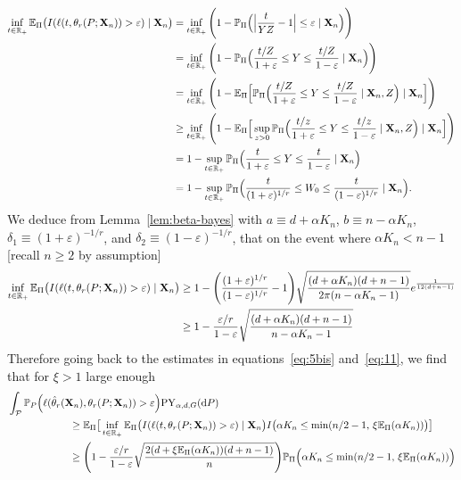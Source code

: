 \documentclass{article}
\newcommand{\1}{\boldsymbol{1}}
\newcommand{\EE}{\mathbb{E}}
\newcommand{\PP}{\mathbb{P}}
\theoremstyle{plain}
\begin{document}
\begin{align*}
  \inf_{t\in \NNReals}\EE_{\Pi}\big(I( \ell(t,\theta_r(P;\mathbf{X}_n)) > \varepsilon ) \mid \mathbf{X}_n\big)%
  \notag
  &= \inf_{t\in \NNReals}\Bigg(1 - \PP_{\Pi}\Big(\Big|\frac{t}{YZ} - 1 \Big| \leq \varepsilon  \mid \mathbf{X}_n\Big) \Bigg)\\
  \notag
  &= \inf_{t\in \NNReals}\Bigg(1 - \PP_{\Pi}\Big( \frac{t/Z}{1+\varepsilon} \leq Y \leq \frac{t/Z}{1-\varepsilon}  \mid \mathbf{X}_n\Big) \Bigg)\\
  \notag
  &=\inf_{t\in \NNReals}\Bigg(1 - \EE_{\Pi}\Big[\PP_{\Pi}\Big( \frac{t/Z}{1+\varepsilon} \leq Y \leq \frac{t/Z}{1-\varepsilon}  \mid \mathbf{X}_n,Z\Big) \mid \mathbf{X}_n\Big] \Bigg)\\
  \notag
  &\geq \inf_{t\in \NNReals}\Bigg(1 - \EE_{\Pi}\Big[\sup_{z > 0}\PP_{\Pi}\Big( \frac{t/z}{1+\varepsilon} \leq Y \leq \frac{t/z}{1-\varepsilon}  \mid \mathbf{X}_n,Z\Big) \mid \mathbf{X}_n\Big] \Bigg)\\
  \notag
  &= 1 - \sup_{t\in \NNReals}\PP_{\Pi}\Big(\frac{t}{1+\varepsilon} \leq Y \leq \frac{t}{1-\varepsilon} \mid \mathbf{X}_n \Big)\\
  &= 1 - \sup_{t\in \NNReals}\PP_{\Pi}\Big(\frac{t}{(1+\varepsilon)^{1/r}} \leq W_0 \leq \frac{t}{(1-\varepsilon)^{1/r}} \mid \mathbf{X}_n \Big).
\end{align*}%
We deduce from Lemma~\ref{lem:beta-bayes} with $a \equiv d + \alpha K_n$, $b \equiv n - \alpha K_n$, $\delta_1 \equiv (1+\varepsilon)^{-1/r}$, and $\delta_2 \equiv (1-\varepsilon)^{-1/r}$, that on the event where $\alpha K_n < n-1$ [recall $n\geq 2$ by assumption]
\begin{align*}
  \notag
  \inf_{t\in \NNReals}\EE_{\Pi}\big(I( \ell(t,\theta_r(P;\mathbf{X}_n)) > \varepsilon ) \mid \mathbf{X}_n\big)%
  &\geq 1 - \Bigg(\frac{(1+\varepsilon)^{1/r}}{(1-\varepsilon)^{1/r}} - 1 \Bigg)\sqrt{\frac{(d + \alpha K_n)(d + n-1)}{2\pi(n - \alpha K_n - 1)}}e^{\frac{1}{12(d+n-1)}}\\
  &\geq 1 - \frac{\varepsilon/r}{1-\varepsilon} \sqrt{\frac{(d + \alpha K_n)(d + n-1)}{n - \alpha K_n - 1}}
\end{align*}
Therefore going back to the estimates in equations~\eqref{eq:5bis} and~\eqref{eq:11}, we find that for $\xi > 1$ large enough
\begin{align}
  \notag
  &\int_{\mathcal{P}}\PP_P\Big(\ell(\hat{\theta}_r(\mathbf{X}_n),\theta_r(P;\mathbf{X}_n)) > \varepsilon \Big) \mathrm{PY}_{\alpha,d,G}(\intd P)\\
  \notag
  &\qquad\qquad\qquad\geq \EE_{\Pi}\big[ \inf_{t \in \NNReals} \EE_{\Pi}\big(I(  \ell(t,\theta_r(P;\mathbf{X}_n)) > \varepsilon ) \mid \mathbf{X}_n\big)I\big(\alpha K_n \leq \min(n/2-1,\, \xi \EE_{\Pi}(\alpha K_n)) \big) \big]\\
  \label{eq:5ter}
  &\qquad\qquad\qquad\geq \Bigg(1 - \frac{\varepsilon/r}{1-\varepsilon}\sqrt{\frac{2(d+\xi \EE_{\Pi}(\alpha K_n))(d+n-1)}{n}} \Bigg)\PP_{\Pi}\Big(\alpha K_n \leq \min(n/2-1,\, \xi \EE_{\Pi}(\alpha K_n))  \Big)
\end{align}
\end{document}
